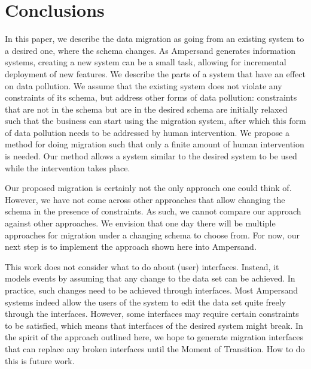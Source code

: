 \documentclass[runningheads]{llncs}
\begin{document}
\section{Conclusions}

   In this paper, we describe the data migration as going from an existing system to a desired one, where the schema changes.
   As Ampersand generates information systems, creating a new system can be a small task, allowing for incremental deployment of new features.
   We describe the parts of a system that have an effect on data pollution.
   We assume that the existing system does not violate any constraints of its schema, but address other forms of data pollution:
   constraints that are not in the schema but are in the desired schema are initially relaxed such that the business can start using the migration system, after which this form of data pollution needs to be addressed by human intervention.
   We propose a method for doing migration such that only a finite amount of human intervention is needed.
   Our method allows a system similar to the desired system to be used while the intervention takes place.

   Our proposed migration is certainly not the only approach one could think of.
   However, we have not come across other approaches that allow changing the schema in the presence of constraints.
   As such, we cannot compare our approach against other approaches.
   We envision that one day there will be multiple approaches for migration under a changing schema to choose from.
   For now, our next step is to implement the approach shown here into Ampersand.

   This work does not consider what to do about (user) interfaces.
   Instead, it models events by assuming that any change to the data set can be achieved.
   In practice, such changes need to be achieved through interfaces.
   Most Ampersand systems indeed allow the users of the system to edit the data set quite freely through the interfaces.
   However, some interfaces may require certain constraints to be satisfied, which means that interfaces of the desired system might break.
   In the spirit of the approach outlined here, we hope to generate migration interfaces that can replace any broken interfaces until the Moment of Transition.
   How to do this is future work.



\end{document}
